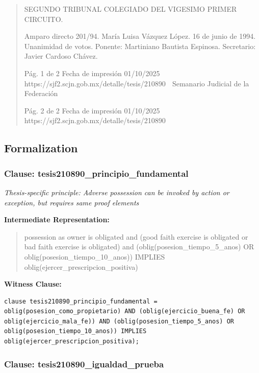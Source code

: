\documentclass[11pt,a4paper]{article}
\begin{document}
\begin{quote}
SEGUNDO TRIBUNAL COLEGIADO DEL VIGESIMO PRIMER CIRCUITO.


Amparo directo 201/94. María Luisa Vázquez López. 16 de junio de 1994. Unanimidad de votos.
Ponente: Martiniano Bautista Espinosa. Secretario: Javier Cardoso Chávez.




                                             Pág. 1 de 2             Fecha de impresión 01/10/2025
  https://sjf2.scjn.gob.mx/detalle/tesis/210890
                                                Semanario Judicial de la Federación




                                           Pág. 2 de 2       Fecha de impresión 01/10/2025
https://sjf2.scjn.gob.mx/detalle/tesis/210890

\end{quote}

\subsection{Formalization}

\subsubsection{Clause: tesis210890\_principio\_fundamental}

\textit{Thesis-specific principle: Adverse possession can be invoked by action or exception, but requires same proof elements}

\textbf{Intermediate Representation:}

\begin{quote}
possession as owner is obligated and (good faith exercise is obligated or bad faith exercise is obligated) and (oblig(posesion\_tiempo\_5\_anos) OR oblig(posesion\_tiempo\_10\_anos)) IMPLIES oblig(ejercer\_prescripcion\_positiva)
\end{quote}

\textbf{Witness Clause:}

\begin{lstlisting}[style=witnessstyle, language=Witness]
clause tesis210890_principio_fundamental = oblig(posesion_como_propietario) AND (oblig(ejercicio_buena_fe) OR oblig(ejercicio_mala_fe)) AND (oblig(posesion_tiempo_5_anos) OR oblig(posesion_tiempo_10_anos)) IMPLIES oblig(ejercer_prescripcion_positiva);
\end{lstlisting}

\subsubsection{Clause: tesis210890\_igualdad\_prueba}
\end{document}
